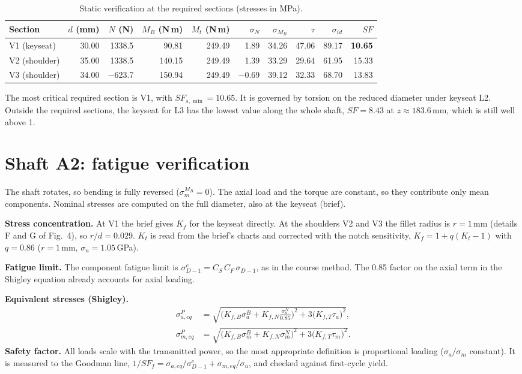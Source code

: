\documentclass[11pt,a4paper]{article}
\begin{document}
\begin{table}[H]\centering\small
\caption{Static verification at the required sections (stresses in MPa).}
\setlength{\tabcolsep}{4.5pt}
\begin{tabular}{lrrrrrrrrr}\toprule
Section & $d$ (mm) & $N$ (N) & $M_B$ (N\,m) & $M_t$ (N\,m) & $\sigma_N$ & $\sigma_{M_B}$ & $\tau$ & $\sigma_{id}$ & $SF$\\\midrule
V1 (keyseat) & 30.00 & 1338.5 & 90.81 & 249.49 & 1.89 & 34.26 & 47.06 & 89.17 & \textbf{10.65}\\
V2 (shoulder) & 35.00 & 1338.5 & 140.15 & 249.49 & 1.39 & 33.29 & 29.64 & 61.95 & 15.33\\
V3 (shoulder) & 34.00 & \ensuremath{-}623.7 & 150.94 & 249.49 & \ensuremath{-}0.69 & 39.12 & 32.33 & 68.70 & 13.83\\\bottomrule
\end{tabular}\end{table}
The most critical required section is V1, with $SF_{s,\min}=10.65$. It is governed by torsion on the reduced diameter under keyseat L2. Outside the required sections, the keyseat for L3 has the lowest value along the whole shaft, $SF=8.43$ at $z\approx183.6$\,mm, which is still well above 1.

\section{Shaft A2: fatigue verification}
The shaft rotates, so bending is fully reversed ($\sigma_m^{M_B}=0$). The axial load and the torque are constant, so they contribute only mean components. Nominal stresses are computed on the full diameter, also at the keyseat (brief).

\textbf{Stress concentration.} At V1 the brief gives $K_f$ for the keyseat directly. At the shoulders V2 and V3 the fillet radius is $r=1$\,mm (details F and G of Fig.~4), so $r/d=0.029$. $K_t$ is read from the brief's charts and corrected with the notch sensitivity, $K_f=1+q(K_t-1)$ with $q=0.86$ ($r=1$\,mm, $\sigma_u=1.05$\,GPa).

\textbf{Fatigue limit.} The component fatigue limit is $\sigma_{D-1}^c=C_S\,C_F\,\sigma_{D-1}$, as in the course method. The 0.85 factor on the axial term in the Shigley equation already accounts for axial loading.

\textbf{Equivalent stresses (Shigley).}
\begin{align*}
\sigma_{a,eq}^P&=\sqrt{\Big(K_{f,B}\sigma_a^{B}+K_{f,N}\frac{\sigma_a^N}{0.85}\Big)^2+3\big(K_{f,T}\tau_a\big)^2},\\
\sigma_{m,eq}^P&=\sqrt{\big(K_{f,B}\sigma_m^{B}+K_{f,N}\sigma_m^N\big)^2+3\big(K_{f,T}\tau_m\big)^2}.
\end{align*}
\textbf{Safety factor.} All loads scale with the transmitted power, so the most appropriate definition is proportional loading ($\sigma_a/\sigma_m$ constant). It is measured to the Goodman line, $1/SF_f=\sigma_{a,eq}/\sigma_{D-1}^c+\sigma_{m,eq}/\sigma_u$, and checked against first-cycle yield.
\end{document}
